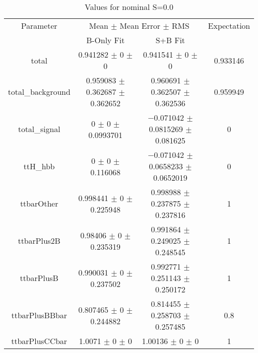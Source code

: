 \begin{table}
\centering
\caption{Values for nominal S=0.0}
\begin{tabular}{cccc}
\toprule
Parameter & \multicolumn{2}{c}{Mean $\pm$ Mean Error $\pm$ RMS} & Expectation\\
 & B-Only Fit & S+B Fit & \\
\midrule
total & \num{0.941282} $\pm$ \num{0} $\pm$ \num{0} & \num{0.941541} $\pm$ \num{0} $\pm$ \num{0} & \num{0.933146}\\
total\_background & \num{0.959083} $\pm$ \num{0.362687} $\pm$ \num{0.362652} & \num{0.960691} $\pm$ \num{0.362507} $\pm$ \num{0.362536} & \num{0.959949}\\
total\_signal & \num{0} $\pm$ \num{0} $\pm$ \num{0.0993701} & \num{-0.071042} $\pm$ \num{0.0815269} $\pm$ \num{0.081625} & \num{0}\\
ttH\_hbb & \num{0} $\pm$ \num{0} $\pm$ \num{0.116068} & \num{-0.071042} $\pm$ \num{0.0658233} $\pm$ \num{0.0652019} & \num{0}\\
ttbarOther & \num{0.998441} $\pm$ \num{0} $\pm$ \num{0.225948} & \num{0.998988} $\pm$ \num{0.237875} $\pm$ \num{0.237816} & \num{1}\\
ttbarPlus2B & \num{0.98406} $\pm$ \num{0} $\pm$ \num{0.235319} & \num{0.991864} $\pm$ \num{0.249025} $\pm$ \num{0.248545} & \num{1}\\
ttbarPlusB & \num{0.990031} $\pm$ \num{0} $\pm$ \num{0.237502} & \num{0.992771} $\pm$ \num{0.251143} $\pm$ \num{0.250172} & \num{1}\\
ttbarPlusBBbar & \num{0.807465} $\pm$ \num{0} $\pm$ \num{0.244882} & \num{0.814455} $\pm$ \num{0.258703} $\pm$ \num{0.257485} & \num{0.8}\\
ttbarPlusCCbar & \num{1.0071} $\pm$ \num{0} $\pm$ \num{0} & \num{1.00136} $\pm$ \num{0} $\pm$ \num{0} & \num{1}\\
\bottomrule
\end{tabular}
\end{table}